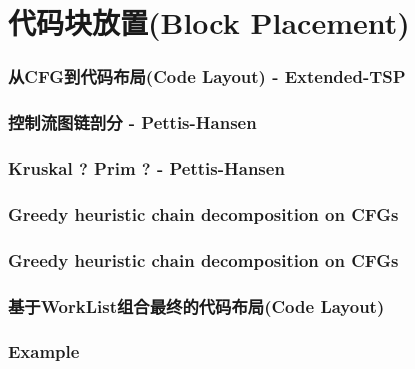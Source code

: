 \section{代码块放置(Block Placement)}

\begin{frame}
    \frametitle{从CFG到代码布局(Code Layout) - Extended-TSP}
    
\end{frame}

\begin{frame}
    \frametitle{控制流图链剖分 - Pettis-Hansen}
    
\end{frame}


\begin{frame}[fragile]
    \frametitle{Kruskal ? Prim ? - Pettis-Hansen}
    
\end{frame}

\begin{frame}
    \frametitle{Greedy heuristic chain decomposition on CFGs}
    
\end{frame}

\begin{frame}
    \frametitle{Greedy heuristic chain decomposition on CFGs}
    
\end{frame}


\begin{frame}
    \frametitle{基于WorkList组合最终的代码布局(Code Layout)}
    
\end{frame}


\begin{frame}
    \frametitle{Example}
    
\end{frame}